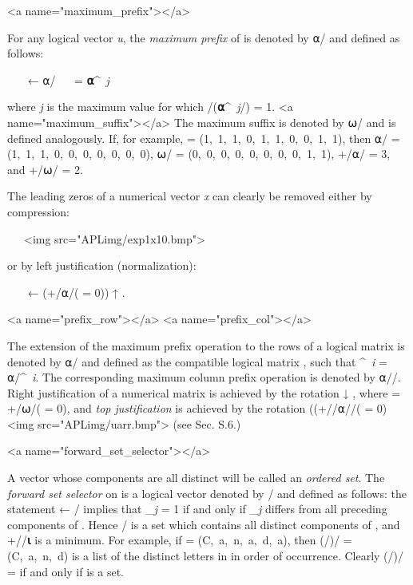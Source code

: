 <a name="maximum_prefix"></a>
\par For any logical vector \textit{u}, the \textit{maximum prefix} of  is denoted by ⍺/ and defined as follows:

\par \ \ \  ← ⍺/ \ \leftrightarrow\  = \textbf{⍺}^{\textit{\ j}}

\par where \textit{j} is the maximum value for which \wedge/(\textbf{⍺}^{\textit{\ j}}/) = 1.
<a name="maximum_suffix"></a> The maximum suffix is denoted by ⍵/ and is defined analogously. If, for example,  = (1,\ 1,\ 1,\ 0,\ 1,\ 1,\ 0,\ 0,\ 1,\ 1), then ⍺/ = (1,\ 1,\ 1,\ 0,\ 0,\ 0,\ 0,\ 0,\ 0,\ 0),
⍵/ = (0,\ 0,\ 0,\ 0,\ 0,\ 0,\ 0,\ 0,\ 1,\ 1), +/⍺/ = 3, and +/⍵/ = 2.

\par The leading zeros of a numerical vector \textit{x} can clearly be removed either by compression:

\par \ \ \ <img src="APLimg/exp1x10.bmp">

\par or by left justification (normalization):

\par \ \ \  ← (+/⍺/( = 0)) ↑ .

<a name="prefix_row"></a>
<a name="prefix_col"></a>
\par The extension of the maximum prefix operation to the rows of a logical matrix  is denoted by ⍺/ and defined as the compatible logical matrix
, such that 
^{\textit{\ i}} = ⍺/^{\textit{\ i}}. The corresponding maximum column prefix operation is denoted by ⍺//. Right justification of a numerical matrix
 is achieved by the rotation
 ↓ , where  = +/⍵/( = 0), and \textit{top justification} is achieved by the rotation ((+//⍺//( = 0) 
<img src="APLimg/uarr.bmp">  (see Sec. S.6.)

<a name="forward_set_selector"></a>
\par A vector whose components are all distinct will be called an \textit{ordered set}. The \textit{forward set selector} on  is a logical vector denoted by \textit{\sigma}/ and defined as follows: the statement  ← \textit{\sigma}/ implies that _{\textit{j}} = 1 if and only if _{\textit{j}} differs from all preceding components of . Hence / is a set which contains all distinct components of , and +//\textbf{⍳} is a minimum. For example, if  = (C,\ a,\ n,\ a,\ d,\ a), then (\textit{\sigma}/)/ = (C,\ a,\ n,\ d) is a list of the distinct letters in  in order of occurrence. Clearly (\textit{\sigma}/)/ =  if and only if  is a set.

